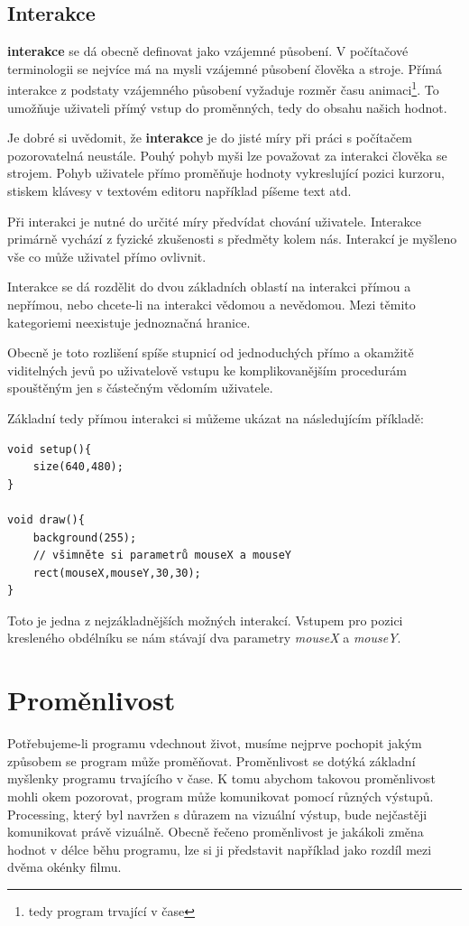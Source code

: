 \documentclass[11pt]{book}
\newcommand{\oddil}[1]{\section{#1}\label{sec:#1}}
\newcommand{\pododdil}[1]{\subsection{#1}\label{subsec:#1}}
\newcommand{\slovnik}[1]{\textbf{\gls{#1}}\index{#1}}
\newcommand{\Slovnik}[1]{\textbf{\Gls{#1}}\index{#1}}
\newcommand{\vyraz}[1]{\textit{\gls{#1}}\index{#1}}
\begin{document}
\pododdil{Interakce}

\Slovnik{interakce} se dá obecně definovat jako vzájemné působení. V počítačové terminologii se nejvíce má na mysli vzájemné působení člověka a stroje. Přímá interakce z podstaty vzájemného působení vyžaduje rozměr času animaci\footnote{tedy program trvající v čase}. To umožňuje uživateli přímý vstup do proměnných, tedy do obsahu našich hodnot.

Je dobré si uvědomit, že \slovnik{interakce} je do jisté míry při práci s počítačem pozorovatelná neustále. Pouhý pohyb myši lze považovat za interakci člověka se strojem. Pohyb uživatele přímo proměňuje hodnoty vykreslující pozici kurzoru, stiskem klávesy v textovém editoru například píšeme text atd.

Při interakci je nutné do určité míry předvídat chování uživatele. Interakce primárně vychází z fyzické zkušenosti s předměty kolem nás. Interakcí je myšleno vše co může uživatel přímo ovlivnit.

Interakce se dá rozdělit do dvou základních oblastí na interakci přímou a nepřímou, nebo chcete-li na interakci vědomou a nevědomou. Mezi těmito kategoriemi neexistuje jednoznačná hranice.

Obecně je toto rozlišení spíše stupnicí od jednoduchých přímo a okamžitě viditelných jevů po uživatelově vstupu ke komplikovanějším procedurám spouštěným jen s částečným vědomím uživatele.

Základní tedy přímou interakci si můžeme ukázat na následujícím příkladě:

\begin{lstlisting}
void setup(){
	size(640,480);
}

void draw(){
	background(255);
	// všimněte si parametrů mouseX a mouseY
	rect(mouseX,mouseY,30,30);
}
\end{lstlisting}

Toto je jedna z nejzákladnějších možných interakcí. Vstupem pro pozici kresleného obdélníku se nám stávají dva parametry \vyraz{mouseX} a \vyraz{mouseY}.


\oddil{Proměnlivost}


Potřebujeme-li programu vdechnout život, musíme nejprve pochopit jakým způsobem se program může proměňovat. Proměnlivost se dotýká základní myšlenky programu trvajícího v čase. K tomu abychom takovou proměnlivost mohli okem pozorovat, program může komunikovat pomocí různých výstupů. Processing, který byl navržen s důrazem na vizuální výstup, bude nejčastěji komunikovat právě vizuálně. Obecně řečeno proměnlivost je jakákoli změna hodnot v délce běhu programu, lze si ji představit například jako rozdíl mezi dvěma okénky filmu.
\end{document}
